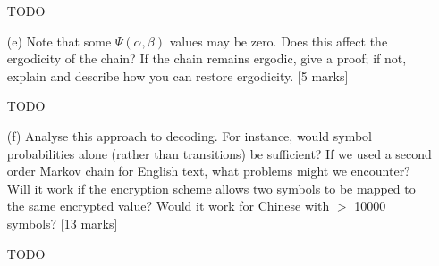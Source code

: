 \documentclass[12pt]{article}
\begin{document}
\begin{enumerate}
TODO

\item[(e)] Note that some $\Psi(\alpha, \beta)$ values may be zero. Does this affect the ergodicity of the chain? If the chain remains ergodic, give a proof; if not, explain and describe how you can restore ergodicity. [5 marks]

TODO

\item[(f)] Analyse this approach to decoding. For instance, would symbol probabilities alone (rather than transitions) be sufficient? If we used a second order Markov chain for English text, what problems might we encounter? Will it work if the encryption scheme allows two symbols to be mapped to the same encrypted value? Would it work for Chinese with $>$ 10000 symbols? [13 marks]

TODO

\end{enumerate}
\newpage
\end{document}
